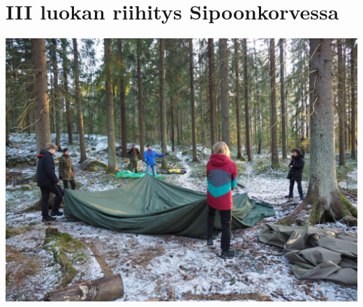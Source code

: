 
\section{III luokan riihitys Sipoonkorvessa}

\noindent\includegraphics[width=1.0\linewidth]{assets/telttaretki4}

